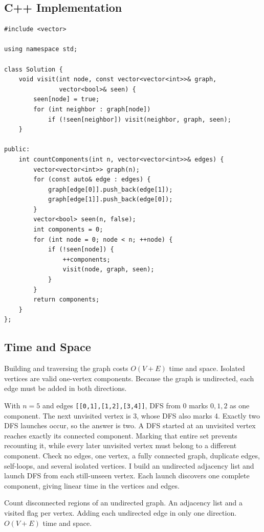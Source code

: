 \subsection{C++ Implementation}
\begin{lstlisting}[style=compactcode,caption={Complete C++ solution: Connected Components}]
#include <vector>

using namespace std;

class Solution {
    void visit(int node, const vector<vector<int>>& graph,
               vector<bool>& seen) {
        seen[node] = true;
        for (int neighbor : graph[node])
            if (!seen[neighbor]) visit(neighbor, graph, seen);
    }

public:
    int countComponents(int n, vector<vector<int>>& edges) {
        vector<vector<int>> graph(n);
        for (const auto& edge : edges) {
            graph[edge[0]].push_back(edge[1]);
            graph[edge[1]].push_back(edge[0]);
        }
        vector<bool> seen(n, false);
        int components = 0;
        for (int node = 0; node < n; ++node) {
            if (!seen[node]) {
                ++components;
                visit(node, graph, seen);
            }
        }
        return components;
    }
};
\end{lstlisting}

\subsection{Time and Space}
Building and traversing the graph costs \(O(V+E)\) time and space. Isolated
vertices are valid one-vertex components. Because the graph is undirected,
each edge must be added in both directions.

\lessonexpansion
  {With \(n=5\) and edges \texttt{[[0,1],[1,2],[3,4]]}, DFS from 0 marks
   \(0,1,2\) as one component. The next unvisited vertex is 3, whose DFS also
   marks 4. Exactly two DFS launches occur, so the answer is two.}
  {A DFS started at an unvisited vertex reaches exactly its connected
   component. Marking that entire set prevents recounting it, while every
   later unvisited vertex must belong to a different component.}
  {Check no edges, one vertex, a fully connected graph, duplicate edges,
   self-loops, and several isolated vertices.}
  {I build an undirected adjacency list and launch DFS from each still-unseen
   vertex. Each launch discovers one complete component, giving linear time
   in the vertices and edges.}

\chaptercheckpoint
  {Count disconnected regions of an undirected graph.}
  {An adjacency list and a visited flag per vertex.}
  {Adding each undirected edge in only one direction.}
  {$O(V+E)$ time and space.}


